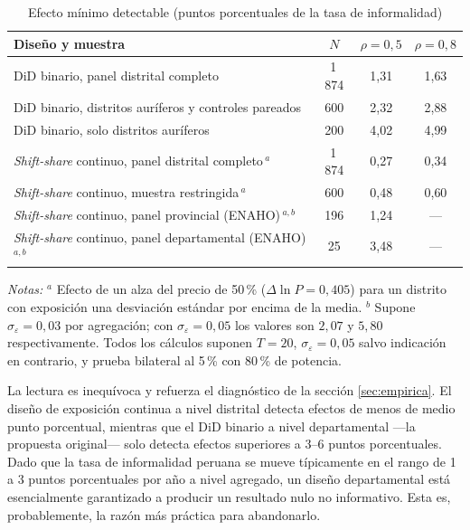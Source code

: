 \documentclass[11pt,a4paper]{article}
\begin{document}
\begin{table}[h!]
\centering
\singlespacing
\caption{Efecto mínimo detectable (puntos porcentuales de la tasa de informalidad)}
\label{tab:potencia}
\small
\begin{tabular}{L{7.2cm} c c c}
\toprule
\textbf{Diseño y muestra} & $N$ & $\rho=0{,}5$ & $\rho=0{,}8$ \\
\midrule
DiD binario, panel distrital completo & 1\,874 & 1{,}31 & 1{,}63 \\
DiD binario, distritos auríferos y controles pareados & 600 & 2{,}32 & 2{,}88 \\
DiD binario, solo distritos auríferos & 200 & 4{,}02 & 4{,}99 \\
\addlinespace
\emph{Shift-share} continuo, panel distrital completo\,$^{a}$ & 1\,874 & 0{,}27 & 0{,}34 \\
\emph{Shift-share} continuo, muestra restringida\,$^{a}$ & 600 & 0{,}48 & 0{,}60 \\
\addlinespace
\emph{Shift-share} continuo, panel provincial (ENAHO)\,$^{a,b}$ & 196 & 1{,}24 & --- \\
\emph{Shift-share} continuo, panel departamental (ENAHO)\,$^{a,b}$ & 25 & 3{,}48 & --- \\
\bottomrule
\end{tabular}

\vspace{0.4em}
\begin{minipage}{0.92\textwidth}
\footnotesize \textit{Notas:} $^{a}$ Efecto de un alza del precio de 50\,\% ($\Delta\ln P = 0{,}405$) para un distrito con exposición una desviación estándar por encima de la media. $^{b}$ Supone $\sigma_\varepsilon = 0{,}03$ por agregación; con $\sigma_\varepsilon = 0{,}05$ los valores son $2{,}07$ y $5{,}80$ respectivamente. Todos los cálculos suponen $T=20$, $\sigma_\varepsilon = 0{,}05$ salvo indicación en contrario, y prueba bilateral al 5\,\% con 80\,\% de potencia.
\end{minipage}
\end{table}

La lectura es inequívoca y refuerza el diagnóstico de la sección \ref{sec:empirica}. El diseño de exposición continua a nivel distrital detecta efectos de menos de medio punto porcentual, mientras que el DiD binario a nivel departamental ---la propuesta original--- solo detecta efectos superiores a 3--6 puntos porcentuales. Dado que la tasa de informalidad peruana se mueve típicamente en el rango de 1 a 3 puntos porcentuales por año a nivel agregado, un diseño departamental está esencialmente garantizado a producir un resultado nulo no informativo. Esta es, probablemente, la razón más práctica para abandonarlo.
\end{document}
